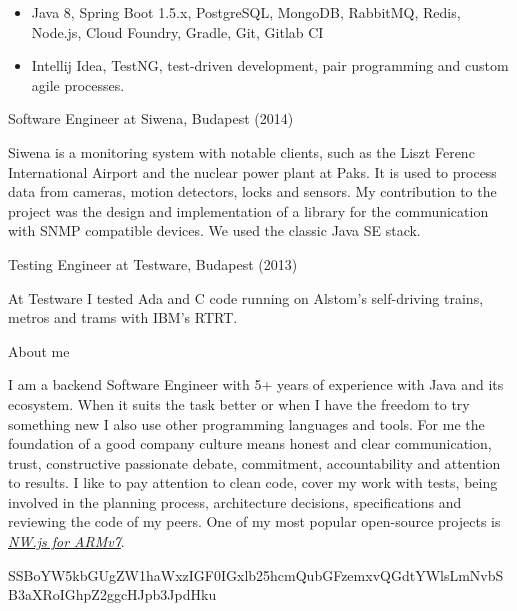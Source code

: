 \documentclass[hidelinks,11pt]{friggeri-cv}
\newenvironment{experience}{\begin{adjustwidth}{-4.6cm}{}}{\end{adjustwidth}}
\begin{document}
\begin{experience}
\begin{itemize}
  \item Java 8, Spring Boot 1.5.x, PostgreSQL, MongoDB, RabbitMQ, Redis, Node.js, Cloud Foundry, Gradle, Git, Gitlab CI
  \item Intellij Idea, TestNG, test-driven development, pair programming and custom agile processes.
\end{itemize}

{\LARGE Software Engineer at Siwena, Budapest (2014)}

Siwena is a monitoring system with notable clients, such as the Liszt Ferenc International Airport and the nuclear power plant at Paks.
It is used to process data from cameras, motion detectors, locks and sensors.
My contribution to the project was the design and implementation of a library for the communication with SNMP compatible devices.
We used the classic Java SE stack.

{\LARGE Testing Engineer at Testware, Budapest (2013)}

At Testware I tested Ada and C code running on Alstom's self-driving trains, metros and trams with IBM's RTRT.

{\LARGE About me}

I am a backend Software Engineer with 5+ years of experience with Java and its ecosystem.
When it suits the task better or when I have the freedom to try something new I also use other programming languages and tools.
For me the foundation of a good company culture means honest and clear communication, trust, constructive passionate debate, commitment, accountability and attention to results.
I like to pay attention to clean code, cover my work with tests, being involved in the planning process, architecture decisions, specifications and reviewing the code of my peers.
One of my most popular open-source projects is \href{https://github.com/LeonardLaszlo/nw.js-armv7-binaries}{\textit{NW.js for ARMv7}}.

SSBoYW5kbGUgZW1haWxzIGF0IGxlb25hcmQubGFzemxvQGdtYWlsLmNvbSB3aXRoIGhpZ2ggcHJpb3JpdHku

\end{experience}
\end{document}
